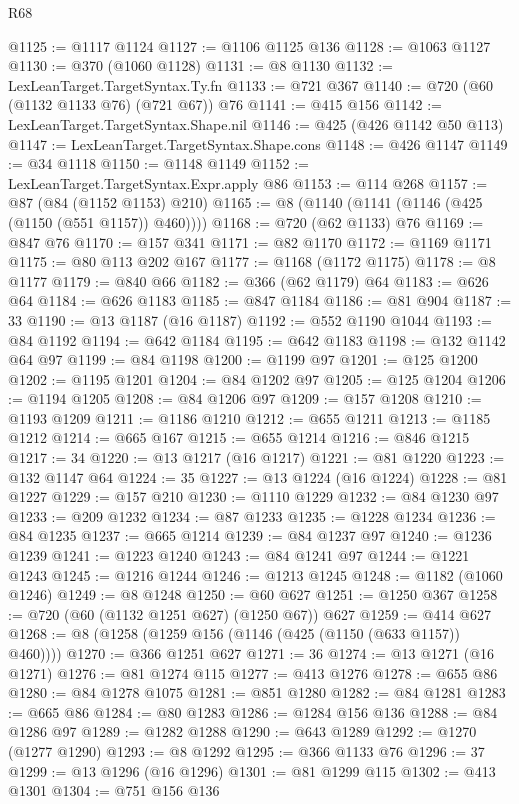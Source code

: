 \begin{lexlean}{R68}
\begin{coremodule}
@1125 := @1117 @1124
@1127 := @1106 @1125 @136
@1128 := @1063 @1127
@1130 := @370 (@1060 @1128)
@1131 := @8 @1130
@1132 := LexLeanTarget.TargetSyntax.Ty.fn
@1133 := @721 @367
@1140 := @720 (@60 (@1132 @1133 @76) (@721 @67)) @76
@1141 := @415 @156
@1142 := LexLeanTarget.TargetSyntax.Shape.nil
@1146 := @425 (@426 @1142 @50 @113)
@1147 := LexLeanTarget.TargetSyntax.Shape.cons
@1148 := @426 @1147
@1149 := @34 @1118
@1150 := @1148 @1149
@1152 := LexLeanTarget.TargetSyntax.Expr.apply @86
@1153 := @114 @268
@1157 := @87 (@84 (@1152 @1153) @210)
@1165 := @8 (@1140 (@1141 (@1146 (@425 (@1150 (@551 @1157)) @460))))
@1168 := @720 (@62 @1133) @76
@1169 := @847 @76
@1170 := @157 @341
@1171 := @82 @1170
@1172 := @1169 @1171
@1175 := @80 @113 @202 @167
@1177 := @1168 (@1172 @1175)
@1178 := @8 @1177
@1179 := @840 @66
@1182 := @366 (@62 @1179) @64
@1183 := @626 @64
@1184 := @626 @1183
@1185 := @847 @1184
@1186 := @81 @904
@1187 := 33
@1190 := @13 @1187 (@16 @1187)
@1192 := @552 @1190 @1044
@1193 := @84 @1192
@1194 := @642 @1184
@1195 := @642 @1183
@1198 := @132 @1142 @64 @97
@1199 := @84 @1198
@1200 := @1199 @97
@1201 := @125 @1200
@1202 := @1195 @1201
@1204 := @84 @1202 @97
@1205 := @125 @1204
@1206 := @1194 @1205
@1208 := @84 @1206 @97
@1209 := @157 @1208
@1210 := @1193 @1209
@1211 := @1186 @1210
@1212 := @655 @1211
@1213 := @1185 @1212
@1214 := @665 @167
@1215 := @655 @1214
@1216 := @846 @1215
@1217 := 34
@1220 := @13 @1217 (@16 @1217)
@1221 := @81 @1220
@1223 := @132 @1147 @64
@1224 := 35
@1227 := @13 @1224 (@16 @1224)
@1228 := @81 @1227
@1229 := @157 @210
@1230 := @1110 @1229
@1232 := @84 @1230 @97
@1233 := @209 @1232
@1234 := @87 @1233
@1235 := @1228 @1234
@1236 := @84 @1235
@1237 := @665 @1214
@1239 := @84 @1237 @97
@1240 := @1236 @1239
@1241 := @1223 @1240
@1243 := @84 @1241 @97
@1244 := @1221 @1243
@1245 := @1216 @1244
@1246 := @1213 @1245
@1248 := @1182 (@1060 @1246)
@1249 := @8 @1248
@1250 := @60 @627
@1251 := @1250 @367
@1258 := @720 (@60 (@1132 @1251 @627) (@1250 @67)) @627
@1259 := @414 @627
@1268 := @8 (@1258 (@1259 @156 (@1146 (@425 (@1150 (@633 @1157)) @460))))
@1270 := @366 @1251 @627
@1271 := 36
@1274 := @13 @1271 (@16 @1271)
@1276 := @81 @1274 @115
@1277 := @413 @1276
@1278 := @655 @86
@1280 := @84 @1278 @1075
@1281 := @851 @1280
@1282 := @84 @1281
@1283 := @665 @86
@1284 := @80 @1283
@1286 := @1284 @156 @136
@1288 := @84 @1286 @97
@1289 := @1282 @1288
@1290 := @643 @1289
@1292 := @1270 (@1277 @1290)
@1293 := @8 @1292
@1295 := @366 @1133 @76
@1296 := 37
@1299 := @13 @1296 (@16 @1296)
@1301 := @81 @1299 @115
@1302 := @413 @1301
@1304 := @751 @156 @136

\end{coremodule}
\end{lexlean}
